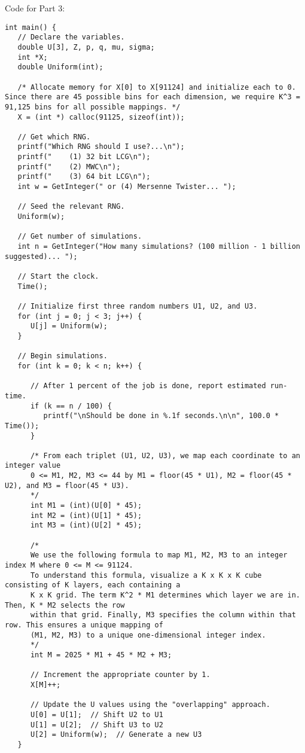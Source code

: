 \documentclass{article}
\begin{document}
\pagebreak
Code for Part 3:
\begin{lstlisting}
int main() {
   // Declare the variables.
   double U[3], Z, p, q, mu, sigma;
   int *X;
   double Uniform(int);

   /* Allocate memory for X[0] to X[91124] and initialize each to 0. Since there are 45 possible bins for each dimension, we require K^3 = 91,125 bins for all possible mappings. */
   X = (int *) calloc(91125, sizeof(int));

   // Get which RNG.
   printf("Which RNG should I use?...\n");
   printf("    (1) 32 bit LCG\n");
   printf("    (2) MWC\n");
   printf("    (3) 64 bit LCG\n");
   int w = GetInteger(" or (4) Mersenne Twister... ");

   // Seed the relevant RNG.
   Uniform(w);

   // Get number of simulations.
   int n = GetInteger("How many simulations? (100 million - 1 billion suggested)... ");

   // Start the clock.
   Time();

   // Initialize first three random numbers U1, U2, and U3.
   for (int j = 0; j < 3; j++) {
      U[j] = Uniform(w);
   }

   // Begin simulations.
   for (int k = 0; k < n; k++) {

      // After 1 percent of the job is done, report estimated run-time.
      if (k == n / 100) {
         printf("\nShould be done in %.1f seconds.\n\n", 100.0 * Time());
      }

      /* From each triplet (U1, U2, U3), we map each coordinate to an integer value
      0 <= M1, M2, M3 <= 44 by M1 = floor(45 * U1), M2 = floor(45 * U2), and M3 = floor(45 * U3).
      */
      int M1 = (int)(U[0] * 45); 
      int M2 = (int)(U[1] * 45);
      int M3 = (int)(U[2] * 45);

      /* 
      We use the following formula to map M1, M2, M3 to an integer index M where 0 <= M <= 91124.
      To understand this formula, visualize a K x K x K cube consisting of K layers, each containing a
      K x K grid. The term K^2 * M1 determines which layer we are in. Then, K * M2 selects the row
      within that grid. Finally, M3 specifies the column within that row. This ensures a unique mapping of
      (M1, M2, M3) to a unique one-dimensional integer index.
      */
      int M = 2025 * M1 + 45 * M2 + M3; 

      // Increment the appropriate counter by 1.
      X[M]++;

      // Update the U values using the "overlapping" approach.
      U[0] = U[1];  // Shift U2 to U1
      U[1] = U[2];  // Shift U3 to U2
      U[2] = Uniform(w);  // Generate a new U3
   }


\end{lstlisting}
\end{document}
